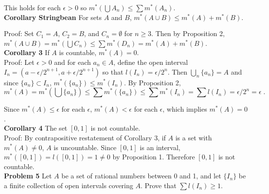 \documentclass[a4paper]{article}
\begin{document}
This holds for each $\epsilon > 0$ so $m^*\left(\bigcup A_n\right) \leq  \sum m^*(A_n)$. \\

{\bf Corollary Stringbean} For sets $A$ and $B$, $m^*(A\cup B) \leq m^*(A) + m^*(B)$.

Proof: Set $C_1 = A$, $C_2 = B$, and $C_n = \emptyset$ for $n \geq 3$. Then by Proposition 2, $m^*(A\cup B) = m^*\left(\bigcup C_n\right) \leq \sum m^*(D_n) = m^*(A) + m^*(B)$. \\

{\bf Corollary 3} If $A$ is countable, $m^*(A) = 0$. \\

Proof: Let $\epsilon >0$ and for each $a_n \in A$, define the open interval $I_n = (a-\epsilon/2^{n+1}, a+ \epsilon/2^{n+1})$ so that $l(I_n) = \epsilon/2^n$. Then $\bigcup_{n} \{a_n\} = A$ and since $\{a_n\} \subset I_n$, $m^*(\{a_n\}) \leq m^*(I_n)$. By Proposition 2,
$$m^*(A) = m^*\left(\bigcup \{a_n\}\right) \leq \sum m^*(\{a_n\}) \leq \sum m^*(I_n) = \sum l(I_n) = \epsilon/2^n = \epsilon \;.$$

Since $m^*(A) \leq \epsilon$ for each $\epsilon$, $m^*(A) < \epsilon $ for each $\epsilon$, which implies $m^*(A) = 0$. \\

{\bf Corollary 4} The set $[0,1]$ is not countable. \\

Proof: By contrapositive restatement of Corollary 3, if $A$ is a set with $m^*(A) \neq 0$, $A$ is uncountable. Since $[0,1]$ is an interval, $m^*([0,1]) = l([0,1]) = 1\neq 0$ by Proposition 1. Therefore $[0,1]$ is not countable. \\


{\bf Problem 5} Let $A$ be a set of rational numbers between 0 and 1, and let $\{I_n\}$ be a finite collection of open intervals covering $A$. Prove that $\sum l(I_n) \geq 1$. \\
\end{document}
